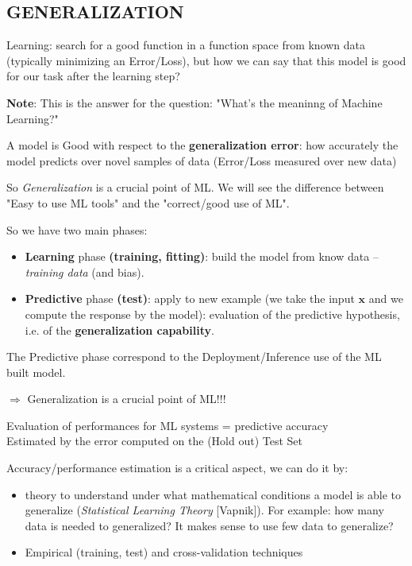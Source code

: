 \documentclass[../main.tex]{subfiles}
\begin{document}
\subsection{GENERALIZATION}
Learning: search for a good function in a function space from known data (typically minimizing an Error/Loss), but how we can say that this model is good for our task after the learning step?

\textbf{Note}: This is the answer for the question: "What's the meaninng of Machine Learning?"
\begin{center}
    A model is Good with respect to the \textbf{generalization error}: how accurately the model predicts over novel samples of data (Error/Loss measured over new data) 
\end{center}

So \textit{Generalization} is a crucial point of ML. We will see the difference between "Easy to use ML tools" and the "correct/good use of ML".

So we have two main phases:
\begin{itemize}
    \item \textbf{Learning} phase \textbf{(training, fitting)}: build the model from know data – \emph{training data} (and bias).
    \item \textbf{Predictive} phase \textbf{(test)}: apply to new example (we take the input $\textbf{x}$ and we compute the response by the model): evaluation of the predictive hypothesis, i.e. of the \textbf{generalization capability}.
\end{itemize}
The Predictive phase correspond to the Deployment/Inference use of the ML built model.

\noindent$\Rightarrow$ Generalization is a crucial point of ML!!!
\begin{center}
    Evaluation of performances for ML systems = predictive accuracy\\
    Estimated by the error computed on the (Hold out) Test Set
\end{center}

\noindent Accuracy/performance estimation is a critical aspect, we can do it by:
\begin{itemize}
    \item theory to understand under what mathematical conditions a model is able to generalize (\textit{Statistical Learning Theory} [Vapnik]). For example: how many data is needed to generalized? It makes sense to use few data to generalize?
    \item Empirical (training, test) and cross-validation techniques
\end{itemize}
\end{document}
